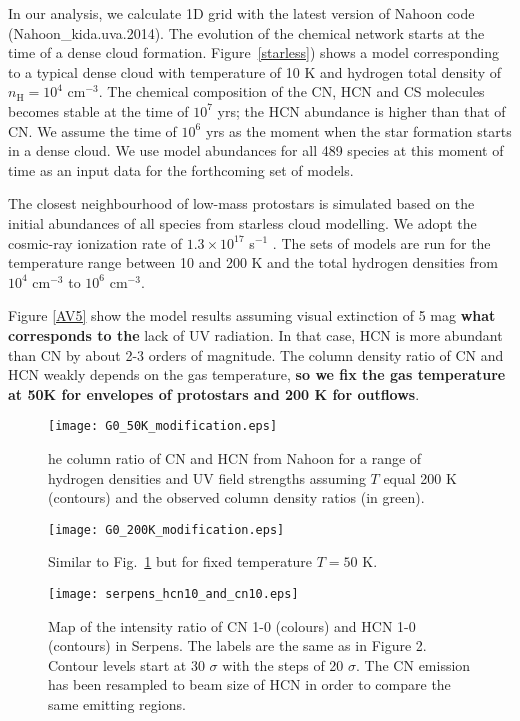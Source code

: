 \documentclass{aa}
\begin{document}
In our analysis, we calculate 1D grid with the latest version of Nahoon code (Nahoon\_kida.uva.2014). 
The evolution of the chemical network starts at the time of a dense cloud formation.
Figure~\ref{starless}) shows a model corresponding to a typical dense cloud with temperature of 10 K
and hydrogen total density of $n_\mathrm{H} = 10^4$ cm$^{-3}$. The chemical composition
of the CN, HCN and CS molecules becomes stable at the time of $10^{7}$ yrs; the HCN abundance is higher
than that of CN. We assume the time of $10^{6}$ yrs as the moment when the star formation starts in
a dense cloud. We use model abundances for all 489 species at this moment of time 
as an input data for the forthcoming set of models.

The closest neighbourhood of low-mass protostars is simulated based on the initial abundances of
all species from starless cloud modelling. We adopt the cosmic-ray ionization
rate of $1.3\times 10^{17}$ s$^{-1}$ \citep{Cra78}. The sets of models are run
for the temperature range between 10 and 200 K and the total hydrogen densities from $10^4$
cm$^{-3}$ to $10^6$ cm$^{-3}$. 

Figure \ref{AV5} show the model results assuming visual extinction of 5 mag \textbf{what corresponds to the} lack 
of UV radiation. In that case, HCN is more abundant than CN by about 2-3
orders of magnitude. The column density ratio of CN and HCN weakly depends on the 
gas temperature, \textbf{so we fix the gas temperature at 50K for envelopes of protostars and 200 K for outflows}.
\begin{figure} 
\centering \texttt{[image: G0\_50K\_modification.eps]} 
\caption{he column ratio of CN and HCN from Nahoon for a 
range of hydrogen densities and UV field strengths assuming $T$ equal 200 K (contours) 
and the observed column density ratios (in green).} 
\label{G0_50} 
\end{figure}
\begin{figure} 
\centering 
\texttt{[image: G0\_200K\_modification.eps]} 
\caption{Similar to Fig.~\ref{G0_50} but for fixed temperature $T = 50$ K.} 
\label{G0_200} 
\end{figure}
\begin{figure} 
\centering 
\texttt{[image: serpens\_hcn10\_and\_cn10.eps]}
\caption{Map of the intensity ratio of CN 1-0 (colours) and HCN 1-0
(contours) in Serpens. The labels are the same as in Figure 2. Contour levels start at 30 $\sigma$ with the steps of 20 $\sigma$.
The CN emission has been resampled to beam size of HCN in order to compare the same emitting regions.} 
\label{cn10_and_hcn10} 
\end{figure}
\end{document}
